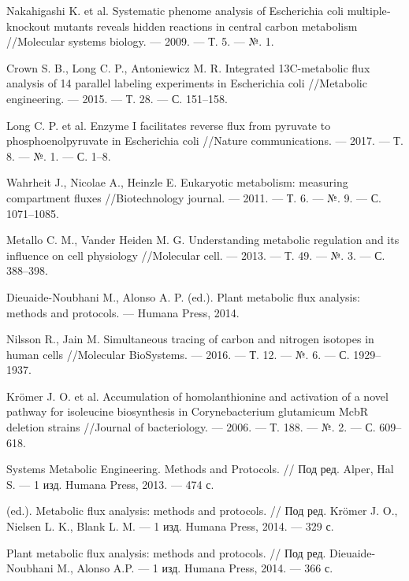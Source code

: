 \documentclass[a4paper, 12pt, left=30mm, right=15mm, top=20mm, bottom=20mm]{report}
\begin{document}
\begin{thebibliography}{XXXX}
	Nakahigashi K. et al. Systematic phenome analysis of Escherichia coli multiple‐knockout mutants reveals hidden reactions in central carbon metabolism //Molecular systems biology. --- 2009. --- Т. 5. --- №. 1.
	
	Crown S. B., Long C. P., Antoniewicz M. R. Integrated 13C-metabolic flux analysis of 14 parallel labeling experiments in Escherichia coli //Metabolic engineering. --- 2015. --- Т. 28. --- С. 151--158.
	
	Long C. P. et al. Enzyme I facilitates reverse flux from pyruvate to phosphoenolpyruvate in Escherichia coli //Nature communications. --- 2017. --- Т. 8. --- №. 1. --- С. 1--8.
	
	Wahrheit J., Nicolae A., Heinzle E. Eukaryotic metabolism: measuring compartment fluxes //Biotechnology journal. --- 2011. --- Т. 6. --- №. 9. --- С. 1071--1085.
	
	Metallo C. M., Vander Heiden M. G. Understanding metabolic regulation and its influence on cell physiology //Molecular cell. --- 2013. --- Т. 49. --- №. 3. --- С. 388--398.
	
	Dieuaide-Noubhani M., Alonso A. P. (ed.). Plant metabolic flux analysis: methods and protocols. --- Humana Press, 2014.
	
	Nilsson R., Jain M. Simultaneous tracing of carbon and nitrogen isotopes in human cells //Molecular BioSystems. --- 2016. --- Т. 12. --- №. 6. --- С. 1929--1937.
	
	Krömer J. O. et al. Accumulation of homolanthionine and activation of a novel pathway for isoleucine biosynthesis in Corynebacterium glutamicum McbR deletion strains //Journal of bacteriology. --- 2006. --- Т. 188. --- №. 2. --- С. 609--618.
	
	Systems Metabolic Engineering. Methods and Protocols. // Под ред. Alper, Hal S. --- 1 изд. Humana Press, 2013. --- 474 с.
	
	(ed.). Metabolic flux analysis: methods and protocols. // Под ред. Krömer J. O., Nielsen L. K., Blank L. M. --- 1 изд. Humana Press, 2014. --- 329 с.
	
	Plant metabolic flux analysis: methods and protocols. // Под ред. Dieuaide-Noubhani M., Alonso A.P. --- 1 изд. Humana Press, 2014. --- 366 с.
	

\end{thebibliography}
\end{document}
